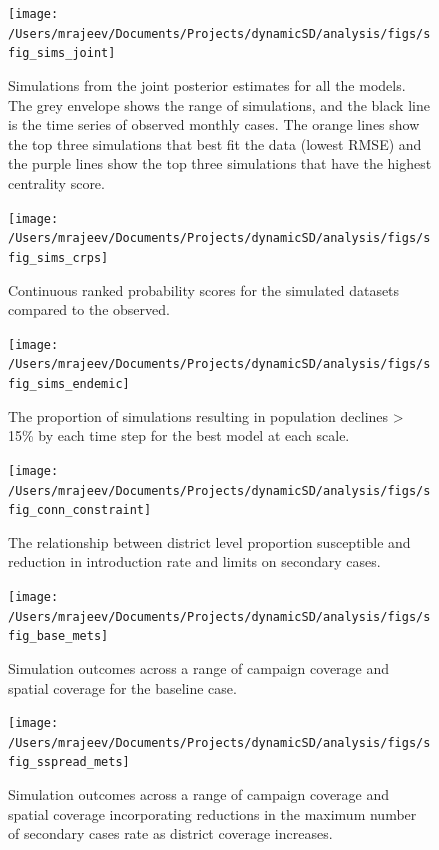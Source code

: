 \documentclass[
  oneside]{book}
\begin{document}
\begin{figure}
\texttt{[image: /Users/mrajeev/Documents/Projects/dynamicSD/analysis/figs/sfig\_sims\_joint]} \caption[Simulations from the joint posterior estimates for all the models.]{Simulations from the joint posterior estimates for all the models. The grey envelope shows the range of simulations, and the black line is the time series of observed monthly cases. The orange lines show the top three simulations that best fit the data (lowest RMSE) and the purple lines show the top three simulations that have the highest centrality score.}\label{fig:sfig-sims-joint}
\end{figure}



\begin{figure}
\texttt{[image: /Users/mrajeev/Documents/Projects/dynamicSD/analysis/figs/sfig\_sims\_crps]} \caption{Continuous ranked probability scores for the simulated datasets compared to the observed.}\label{fig:sfig-sims-crps}
\end{figure}



\begin{figure}
\texttt{[image: /Users/mrajeev/Documents/Projects/dynamicSD/analysis/figs/sfig\_sims\_endemic]} \caption{The proportion of simulations resulting in population declines \textgreater{} 15\% by each time step for the best model at each scale.}\label{fig:sfig-sims-endemic}
\end{figure}



\begin{figure}
\texttt{[image: /Users/mrajeev/Documents/Projects/dynamicSD/analysis/figs/sfig\_conn\_constraint]} \caption{The relationship between district level proportion susceptible and reduction in introduction rate and limits on secondary cases.}\label{fig:sfig-conn-constraint}
\end{figure}



\begin{figure}
\texttt{[image: /Users/mrajeev/Documents/Projects/dynamicSD/analysis/figs/sfig\_base\_mets]} \caption{Simulation outcomes across a range of campaign coverage and spatial coverage for the baseline case.}\label{fig:sfig-base-mets}
\end{figure}



\begin{figure}
\texttt{[image: /Users/mrajeev/Documents/Projects/dynamicSD/analysis/figs/sfig\_sspread\_mets]} \caption[Simulation outcomes across a range of campaign coverage and spatial coverage.]{Simulation outcomes across a range of campaign coverage and spatial coverage incorporating reductions in the maximum number of secondary cases rate as district coverage increases.}\label{fig:sfig-sspread-mets}
\end{figure}
\end{document}

